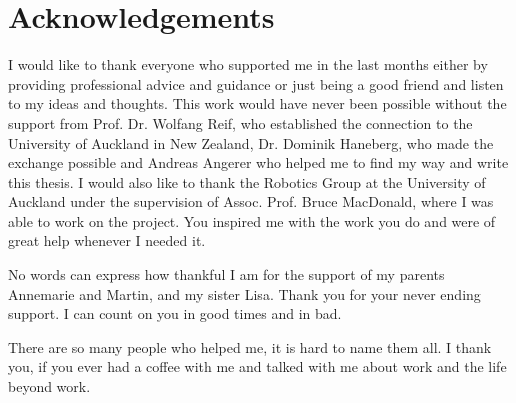\documentclass[12pt,a4paper,headsepline,footsepline,DIV13,BCOR12mm]{scrbook}
\begin{document}
 
\newpage

\renewcommand{\baselinestretch}{2} %


\chapter*{Acknowledgements}
I would like to thank everyone who supported me in the last months either by providing professional advice and guidance or just being a good friend and listen to my ideas and thoughts. This work would have never been possible without the support from Prof. Dr. Wolfang Reif, who established the connection to the University of Auckland in New Zealand, Dr. Dominik Haneberg, who made the exchange possible and Andreas Angerer who helped me to find my way and write this thesis. I would also like to thank the Robotics Group at the University of Auckland under the supervision of Assoc. Prof. Bruce MacDonald, where I was able to work on the project. You inspired me with the work you do and were of great help whenever I needed it.

No words can express how thankful I am for the support of my parents Annemarie and Martin, and my sister Lisa. Thank you for your never ending support. I can count on you in good times and in bad.

There are so many people who helped me, it is hard to name them all. I thank you, if you ever had a coffee with me and talked with me about work and the life beyond work.

\newpage
\end{document}
